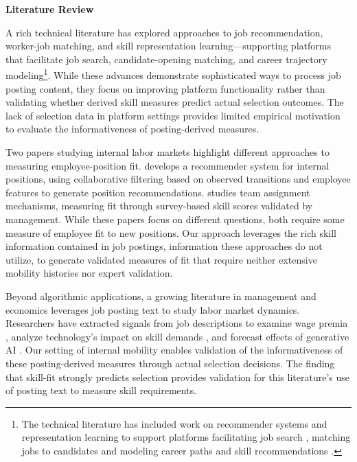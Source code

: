 \documentclass[12pt]{article}
\begin{document}
\textbf{Literature Review}

A rich technical literature has explored approaches to job recommendation, worker-job matching, and skill representation learning---supporting platforms that facilitate job search, candidate-opening matching, and career trajectory modeling\footnote{The technical literature has included work on recommender systems \cite{shaha2012survey,siting2012job} and representation learning \parencite{heap2014combining, zhu2018person, liu2019tripartite, bian2020learning} to support platforms facilitating job search \parencite{heap2014combining,giabelli2021skills2job}, matching jobs to candidates \parencite{zhu2018person,qin2020enhanced} and modeling career paths and skill recommendations \parencite{maurya2017bayesian, kokkodis2021demand}.}. While these advances demonstrate sophisticated ways to process job posting content, they focus on improving platform functionality rather than validating whether derived skill measures predict actual selection outcomes. The lack of selection data in platform settings provides limited empirical motivation to evaluate the informativeness of posting-derived measures.

Two papers studying internal labor markets highlight different approaches to measuring employee-position fit. \textcite{devos2024data} develops a recommender system for internal positions, using collaborative filtering based on observed transitions and employee features to generate position recommendations. \textcite{2024_Cowgill} studies team assignment mechanisms, measuring fit through survey-based skill scores validated by management. While these papers focus on different questions, both require some measure of employee fit to new positions. Our approach leverages the rich skill information contained in job postings, information these approaches do not utilize, to generate validated measures of fit that require neither extensive mobility histories nor expert validation.

Beyond algorithmic applications, a growing literature in management and economics leverages job posting text to study labor market dynamics. Researchers have extracted signals from job descriptions to examine wage premia \parencite{Bana2021}, analyze technology's impact on skill demands \parencite{George2024}, and forecast effects of generative AI \parencite{eloundou2024gpts, 2024_Acemoglu}. Our setting of internal mobility enables validation of the informativeness of these posting-derived measures through actual selection decisions. The finding that skill-fit strongly predicts selection provides validation for this literature's use of posting text to measure skill requirements.
\end{document}
